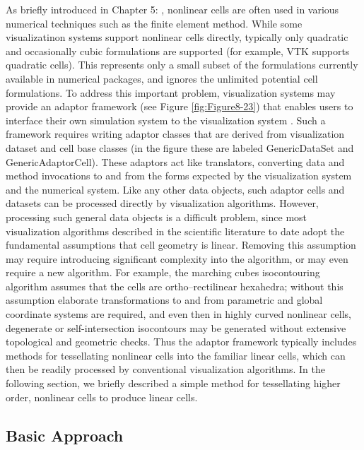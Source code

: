 As briefly introduced in Chapter 5: , nonlinear cells are often used in various numerical techniques such as the finite element method. While some visualizatinon systems support nonlinear cells directly, typically only quadratic and occasionally cubic formulations are supported (for example, VTK supports quadratic cells). This represents only a small subset of the formulations currently available in numerical packages, and ignores the unlimited potential cell formulations. To address this important problem, visualization systems may provide an adaptor framework (see Figure \ref{fig:Figure8-23}) that enables users to interface their own simulation system to the visualization system \cite{Schroeder06}. Such a framework requires writing adaptor classes that are derived from visualization dataset and cell base classes (in the figure these are labeled GenericDataSet and GenericAdaptorCell). These adaptors act like translators, converting data and method invocations to and from the forms expected by the visualization system and the numerical system. Like any other data objects, such adaptor cells and datasets can be processed directly by visualization algorithms. However, processing such general data objects is a difficult problem, since most visualization algorithms described in the scientific literature to date adopt the fundamental assumptions that cell geometry is linear. Removing this assumption may require introducing significant complexity into the algorithm, or may even require a new algorithm. For example, the marching cubes isocontouring algorithm assumes that the cells are ortho--rectilinear hexahedra; without this assumption elaborate transformations to and from parametric and global coordinate systems are required, and even then in highly curved nonlinear cells, degenerate or self-intersection isocontours may be generated without extensive topological and geometric checks. Thus the adaptor framework typically includes methods for tessellating nonlinear cells into the familiar linear cells, which can then be readily processed by conventional visualization algorithms. In the following section, we briefly described a simple method for tessellating higher order, nonlinear cells to produce linear cells.

\subsection{Basic Approach}

